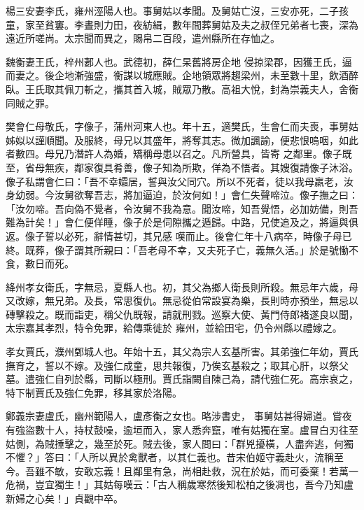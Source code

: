 \begin{pinyinscope}
 楊三安妻李氏，雍州涇陽人也。事舅姑以孝聞。及舅姑亡沒，三安亦死，二子孩童，家至貧窶。李晝則力田，夜紡緝，數年間葬舅姑及夫之叔侄兄弟者七喪，深為遠近所嗟尚。太宗聞而異之，賜帛二百段，遣州縣所在存恤之。



 魏衡妻王氏，梓州郪人也。武德初，薛仁杲舊將房企地
 侵掠梁郡，因獲王氏，逼而妻之。後企地漸強盛，衡謀以城應賊。企地領眾將趨梁州，未至數十里，飲酒醉臥。王氏取其佩刀斬之，攜其首入城，賊眾乃散。高祖大悅，封為崇義夫人，舍衡同賊之罪。



 樊會仁母敬氏，字像子，蒲州河東人也。年十五，適樊氏，生會仁而夫喪，事舅姑姊姒以謹順聞。及服終，母兄以其盛年，將奪其志。微加諷諭，便悲恨嗚咽，如此者數四。母兄乃潛許人為婚，矯稱母患以召之。凡所營具，皆寄
 之鄰里。像子既至，省母無疾，鄰家復具肴善，像子知為所欺，佯為不悟者。其嫂復請像子沐浴。像子私謂會仁曰：「吾不幸孀居，誓與汝父同穴。所以不死者，徒以我母羸老，汝身幼弱。今汝舅欲奪吾志，將加逼迫，於汝何如！」會仁失聲啼泣。像子撫之曰：「汝勿啼。吾向偽不覺者，令汝舅不我為意。聞汝啼，知吾覺悟，必加妨備，則吾難為計矣！」會仁便佯睡，像子於是伺隙攜之遁歸。中路，兄使追及之，將逼與俱返。像子誓以必死，辭情甚切，其兄感
 嘆而止。後會仁年十八病卒，時像子母已終。既葬，像子謂其所親曰：「吾老母不幸，又夫死子亡，義無久活。」於是號慟不食，數日而死。



 絳州孝女衛氏，字無忌，夏縣人也。初，其父為鄉人衛長則所殺。無忌年六歲，母又改嫁，無兄弟。及長，常思復仇。無忌從伯常設宴為樂，長則時亦預坐，無忌以磚擊殺之。既而詣吏，稱父仇既報，請就刑戮。巡察大使、黃門侍郎褚遂良以聞，太宗嘉其孝烈，特令免罪，給傳乘徙於
 雍州，並給田宅，仍令州縣以禮嫁之。



 孝女賈氏，濮州鄄城人也。年始十五，其父為宗人玄基所害。其弟強仁年幼，賈氏撫育之，誓以不嫁。及強仁成童，思共報復，乃俟玄基殺之；取其心肝，以祭父墓。遣強仁自列於縣，司斷以極刑。賈氏詣闕自陳己為，請代強仁死。高宗哀之，特下制賈氏及強仁免罪，移其家於洛陽。



 鄭義宗妻盧氏，幽州範陽人，盧彥衡之女也。略涉書史，
 事舅姑甚得婦道。嘗夜有強盜數十人，持杖鼓噪，逾垣而入，家人悉奔竄，唯有姑獨在室。盧冒白刃往至姑側，為賊捶擊之，幾至於死。賊去後，家人問曰：「群兇擾橫，人盡奔逃，何獨不懼？」答曰：「人所以異於禽獸者，以其仁義也。昔宋伯姬守義赴火，流稱至今。吾雖不敏，安敢忘義！且鄰里有急，尚相赴救，況在於姑，而可委棄！若萬一危禍，豈宜獨生！」其姑每嘆云：「古人稱歲寒然後知松柏之後凋也，吾今乃知盧新婦之心矣！」貞觀中卒。




\end{pinyinscope}
